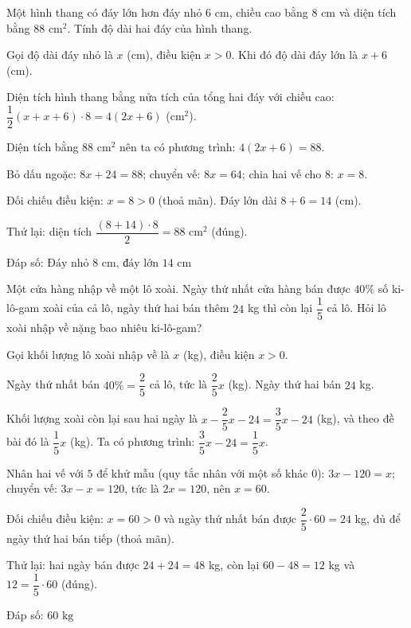 \begin{problem}[8DS-PT1-041]
Một hình thang có đáy lớn hơn đáy nhỏ $6$ cm, chiều cao bằng $8$ cm và diện tích bằng $88$ cm$^2$. Tính độ dài hai đáy của hình thang.

\begin{solution}
Gọi độ dài đáy nhỏ là $x$ (cm), điều kiện $x > 0$. Khi đó độ dài đáy lớn là $x + 6$ (cm).

Diện tích hình thang bằng nửa tích của tổng hai đáy với chiều cao: $\dfrac{1}{2}(x + x + 6) \cdot 8 = 4(2x + 6)$ (cm$^2$).

Diện tích bằng $88$ cm$^2$ nên ta có phương trình: $4(2x + 6) = 88$.

Bỏ dấu ngoặc: $8x + 24 = 88$; chuyển vế: $8x = 64$; chia hai vế cho $8$: $x = 8$.

Đối chiếu điều kiện: $x = 8 > 0$ (thoả mãn). Đáy lớn dài $8 + 6 = 14$ (cm).

Thử lại: diện tích $\dfrac{(8 + 14) \cdot 8}{2} = 88$ cm$^2$ (đúng).

Đáp số: $\boxed{\text{Đáy nhỏ } 8 \text{ cm, đáy lớn } 14 \text{ cm}}$
\end{solution}
\end{problem}

\begin{problem}[8DS-PT1-042]
Một cửa hàng nhập về một lô xoài. Ngày thứ nhất cửa hàng bán được $40\%$ số ki-lô-gam xoài của cả lô, ngày thứ hai bán thêm $24$ kg thì còn lại $\dfrac{1}{5}$ cả lô. Hỏi lô xoài nhập về nặng bao nhiêu ki-lô-gam?

\begin{solution}
Gọi khối lượng lô xoài nhập về là $x$ (kg), điều kiện $x > 0$.

Ngày thứ nhất bán $40\% = \dfrac{2}{5}$ cả lô, tức là $\dfrac{2}{5}x$ (kg). Ngày thứ hai bán $24$ kg.

Khối lượng xoài còn lại sau hai ngày là $x - \dfrac{2}{5}x - 24 = \dfrac{3}{5}x - 24$ (kg), và theo đề bài đó là $\dfrac{1}{5}x$ (kg). Ta có phương trình: $\dfrac{3}{5}x - 24 = \dfrac{1}{5}x$.

Nhân hai vế với $5$ để khử mẫu (quy tắc nhân với một số khác $0$): $3x - 120 = x$; chuyển vế: $3x - x = 120$, tức là $2x = 120$, nên $x = 60$.

Đối chiếu điều kiện: $x = 60 > 0$ và ngày thứ nhất bán được $\dfrac{2}{5} \cdot 60 = 24$ kg, đủ để ngày thứ hai bán tiếp (thoả mãn).

Thử lại: hai ngày bán được $24 + 24 = 48$ kg, còn lại $60 - 48 = 12$ kg và $12 = \dfrac{1}{5} \cdot 60$ (đúng).

Đáp số: $\boxed{60 \text{ kg}}$
\end{solution}
\end{problem}

